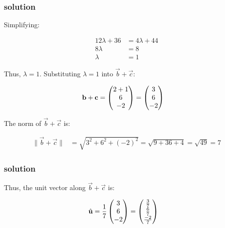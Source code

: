 \documentclass{beamer}
\begin{document}
\begin{frame}
\frametitle{solution}
Simplifying:

\begin{align}
12\lambda + 36 &= 4\lambda + 44 \\
8\lambda &= 8 \\
\lambda &= 1
\end{align}

Thus, $\lambda = 1$. Substituting $\lambda = 1$ into $\vec{b} + \vec{c}$:

\begin{align}
\mathbf{b} + \mathbf{c} &= \begin{pmatrix}2 + 1 \\ 6 \\ -2\end{pmatrix} = \begin{pmatrix}3 \\ 6 \\ -2\end{pmatrix}
\end{align}

The norm of $\vec{b} + \vec{c}$ is:

\begin{align}
\|\vec{b} + \vec{c}\| &= \sqrt{3^2 + 6^2 + (-2)^2} = \sqrt{9 + 36 + 4} = \sqrt{49} = 7
\end{align}
\end{frame}

\begin{frame}
\frametitle{solution}
Thus, the unit vector along $\vec{b} + \vec{c}$ is:

\begin{align}
\hat{\mathbf{u}} &= \frac{1}{7} \begin{pmatrix}3 \\ 6 \\ -2\end{pmatrix} = \begin{pmatrix}\frac{3}{7} \\ \frac{6}{7} \\ \frac{-2}{7}\end{pmatrix}
\end{align}
\end{frame}
\end{document}
